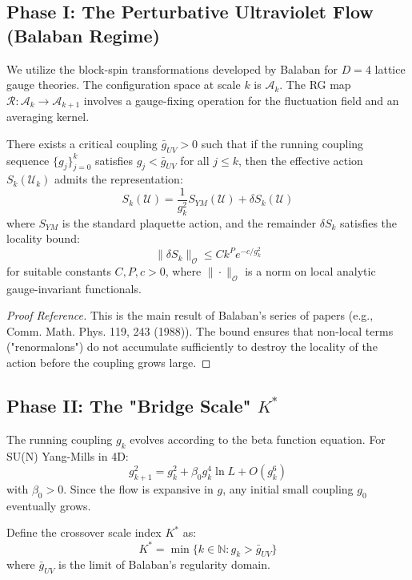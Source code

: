 \subsection{Phase I: The Perturbative Ultraviolet Flow (Balaban Regime)}

We utilize the block-spin transformations developed by Balaban for $D=4$ lattice gauge theories. The configuration space at scale $k$ is $\mathcal{A}_k$. The RG map $\mathcal{R}: \mathcal{A}_k \to \mathcal{A}_{k+1}$ involves a gauge-fixing operation for the fluctuation field and an averaging kernel.

\begin{lemma}
\label{lemma:balaban_control}
There exists a critical coupling $\bar{g}_{UV} > 0$ such that if the running coupling sequence $\{g_j\}_{j=0}^k$ satisfies $g_j < \bar{g}_{UV}$ for all $j \le k$, then the effective action $S_k(\mathcal{U}_k)$ admits the representation:
\[
S_k(\mathcal{U}) = \frac{1}{g_k^2} S_{YM}(\mathcal{U}) + \delta S_k(\mathcal{U})
\]
where $S_{YM}$ is the standard plaquette action, and the remainder $\delta S_k$ satisfies the locality bound:
\[
\| \delta S_k \|_{\mathcal{O}} \le C k^P e^{-c/g_k^2}
\]
for suitable constants $C, P, c > 0$, where $\|\cdot\|_{\mathcal{O}}$ is a norm on local analytic gauge-invariant functionals.
\end{lemma}

\begin{proof}[Proof Reference]
This is the main result of Balaban's series of papers (e.g., Comm. Math. Phys. 119, 243 (1988)). The bound ensures that non-local terms ("renormalons") do not accumulate sufficiently to destroy the locality of the action before the coupling grows large.
\end{proof}

\subsection{Phase II: The "Bridge Scale" \texorpdfstring{$K^*$}{K*}}

The running coupling $g_k$ evolves according to the beta function equation. For SU(N) Yang-Mills in 4D:
\[
g_{k+1}^2 = g_k^2 + \beta_0 g_k^4 \ln L + O(g_k^6)
\]
with $\beta_0 > 0$. Since the flow is expansive in $g$, any initial small coupling $g_0$ eventually grows.

\begin{definition}
Define the crossover scale index $K^*$ as:
\[
K^* = \min \{ k \in \mathbb{N} : g_k > \bar{g}_{UV} \}
\]
where $\bar{g}_{UV}$ is the limit of Balaban's regularity domain.
\end{definition}

